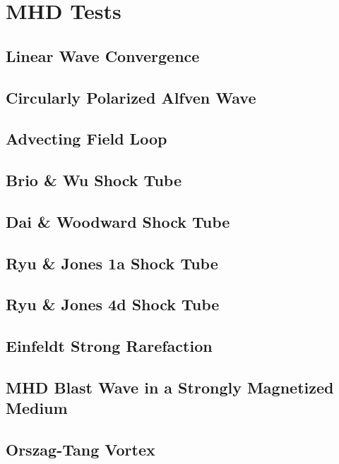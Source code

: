 \section{MHD Tests}
\label{sec:mhd-tests}

\subsection{Linear Wave Convergence}
\subsection{Circularly Polarized Alfven Wave}
\subsection{Advecting Field Loop}
\subsection{Brio \& Wu Shock Tube}
\subsection{Dai \& Woodward Shock Tube}
\subsection{Ryu \& Jones 1a Shock Tube}
\subsection{Ryu \& Jones 4d Shock Tube}
\subsection{Einfeldt Strong Rarefaction}
\subsection{MHD Blast Wave in a Strongly Magnetized Medium}
\subsection{Orszag-Tang Vortex}